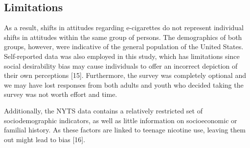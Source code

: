 \documentclass[12pt]{article}
\begin{document}
\subsection{Limitations}
As a result, shifts in attitudes regarding e-cigarettes do not represent individual shifts in attitudes within the same group of persons. The demographics of both groups, however, were indicative of the general population of the United States. Self-reported data was also employed in this study, which has limitations since social desirability bias may cause individuals to offer an incorrect depiction of their own perceptions [15]. Furthermore, the survey was completely optional and we may have lost responses from both adults and youth who decided taking the survey was not worth effort and time. 

Additionally, the NYTS data contains a relatively restricted set of sociodemographic indicators, as well as little information on socioeconomic or familial history. As these factors are linked to teenage nicotine use, leaving them out might lead to bias [16]. 
\end{document}
